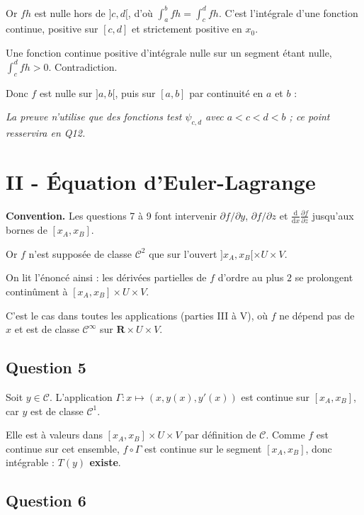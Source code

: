 \documentclass[11pt,a4paper]{article}
\newcommand{\equationajustee}[1]{%
  \sbox{\boiteequation}{$\displaystyle #1$}%
  \ifdim\wd\boiteequation>\linewidth
    \[\resizebox{\linewidth}{!}{\usebox{\boiteequation}}\]%
  \else
    \[#1\]%
  \fi}
\begin{document}
Or \(fh\) est nulle hors de \(]c,d[\), d'où \(\int_a^b fh=\int_c^d fh\). C'est l'intégrale d'une fonction continue, positive sur \([c,d]\) et strictement positive en \(x_0\).

Une fonction continue positive d'intégrale nulle sur un segment étant nulle, \(\int_c^d fh>0\). Contradiction.

Donc \(f\) est nulle sur \(]a,b[\), puis sur \([a,b]\) par continuité en \(a\) et \(b\) :
\equationajustee{\boxed{f=0\ \text{sur}\ [a,b].}}

\emph{La preuve n'utilise que des fonctions test \(\psi_{c,d}\) avec \(a<c<d<b\) ; ce point resservira en Q12.}

\hypertarget{ii---uxe9quation-deuler-lagrange}{%
\section{II - Équation d'Euler-Lagrange}\label{ii---uxe9quation-deuler-lagrange}}

\textbf{Convention.} Les questions 7 à 9 font intervenir \(\partial f/\partial y\), \(\partial f/\partial z\) et \(\frac{\mathrm d}{\mathrm dx}\frac{\partial f}{\partial z}\) jusqu'aux bornes de \([x_A,x_B]\).

Or \(f\) n'est supposée de classe \(\mathcal C^2\) que sur l'ouvert \(]x_A,x_B[\times U\times V\).

On lit l'énoncé ainsi : les dérivées partielles de \(f\) d'ordre au plus \(2\) se prolongent continûment à \([x_A,x_B]\times U\times V\).

C'est le cas dans toutes les applications (parties III à V), où \(f\) ne dépend pas de \(x\) et est de classe \(\mathcal C^\infty\) sur \(\mathbf R\times U\times V\).

\hypertarget{question-5}{%
\subsection{Question 5}\label{question-5}}

Soit \(y\in\mathcal C\). L'application \(\Gamma:x\mapsto(x,y(x),y'(x))\) est continue sur \([x_A,x_B]\), car \(y\) est de classe \(\mathcal C^1\).

Elle est à valeurs dans \([x_A,x_B]\times U\times V\) par définition de \(\mathcal C\). Comme \(f\) est continue sur cet ensemble, \(f\circ\Gamma\) est continue sur le segment \([x_A,x_B]\), donc intégrable : \textbf{\(T(y)\) existe}.

\hypertarget{question-6}{%
\subsection{Question 6}\label{question-6}}
\end{document}
